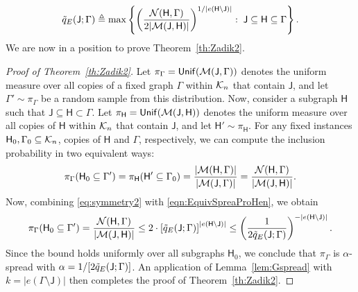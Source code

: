 \documentclass[12pt]{article}
\newcommand{\calK}{{\cal K}}
\newcommand{\calM}{{\cal M}}
\newcommand{\calN}{{\cal N}}
\newcommand{\p}[1]{\left(#1\right)}
\newcommand{\pp}[1]{\left[#1\right]}
\newcommand{\ppp}[1]{\left\{#1\right\}}
\newcommand{\s}[1]{\mathsf{#1}}
\begin{document}
\begin{align}
    \Tilde{q}_E(\s{J};\Gamma)\triangleq\max\ppp{\p{\frac{\calN(\s{H},\Gamma)}{2|\calM(\s{J},\s{H})|}}^{1/|e(\s{H}\setminus\s{J})|}:\;\s{J}\subseteq\s{H}\subseteq \Gamma}.\label{eqn:EquivSpreaProHen}
\end{align}
We are now in a position to prove Theorem~\ref{th:Zadik2}.
\begin{proof}[Proof of Theorem~\ref{th:Zadik2}]
Let $\pi_\Gamma=\s{Unif}(\calM(\s{J},\Gamma))$ denotes the uniform measure over all copies of a fixed graph $\Gamma$ within $\calK_n$ that contain $\s{J}$, and let $\Gamma'\sim\pi_\Gamma$ be a random sample from this distribution. Now, consider a subgraph $\s{H}$ such that $\s{J}\subseteq\s{H}\subset\Gamma$. Let $\pi_{\s{H}}=\s{Unif}(\calM(\s{J},\s{H}))$ denotes the uniform measure over all copies of $\s{H}$ within $\calK_n$ that contain $\s{J}$, and let $\s{H}'\sim\pi_{\s{H}}$. For any fixed instances $\s{H}_0,\Gamma_0\subseteq\calK_n$, copies of $\s{H}$ and $\Gamma$, respectively, we can compute the inclusion probability in two equivalent ways:
\begin{align}
\pi_{\Gamma}(\s{H}_0 \subseteq \Gamma') = \pi_{\s{H}}(\s{H}' \subseteq \Gamma_0) = \frac{|\calM(\s{H},\Gamma)|}{|\calM(\s{J},\Gamma)|}=\frac{\calN(\s{H},\Gamma)}{|\calM(\s{J},\s{H})|}.
\label{eq:symmetry2}
\end{align}
Now, combining \eqref{eq:symmetry2} with \eqref{eqn:EquivSpreaProHen}, we obtain
\begin{align}
\pi_{\Gamma}(\s{H}_0 \subseteq \Gamma') =\frac{\calN(\s{H},\Gamma)}{|\calM(\s{J},\s{H})|} \leq 2\cdot \pp{\Tilde{q}_E(\s{J};\Gamma)}^{|e(\s{H}\setminus\s{J})|} \leq  \left( \frac{1}{2\Tilde{q}_E(\s{J};\Gamma)} \right)^{-|e(\s{H}\setminus\s{J})|}.
\end{align}
Since the bound holds uniformly over all subgraphs $\s{H}_0$, we conclude that $\pi_\Gamma$ is $\alpha$-spread with $\alpha = 1/[2\Tilde{q}_E(\s{J};\Gamma)]$. An application of Lemma~\ref{lem:Gspread} with $k = |e(\Gamma\setminus\s{J})|$ then completes the proof of Theorem~\ref{th:Zadik2}.

\end{proof}
\end{document}
